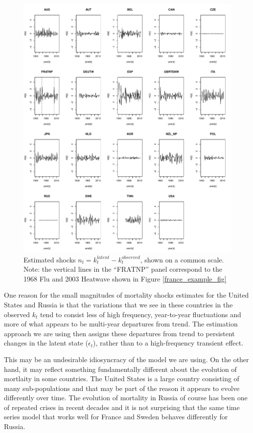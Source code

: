 \documentclass[12pt]{article}
\begin{document}
\begin{figure}
  \includegraphics[width=1.05\textwidth]{./../code/nt_panel_plot.pdf}
  \caption{Estimated shocks $n_t = k_t^{latent} - k_t^{observed}$,
    shown on a common scale. Note: the vertical lines in the
    ``FRATNP'' panel correspond to the 1968 Flu and 2003 Heatwave
    shown in Figure \ref{france_example_fig}}
    \label{nt_panel_fig}
\end{figure}


One reason for the small magnitudes of mortality shocks estimates for
the United States and Russia is that the variations that we see in
these countries in the observed $k_t$ tend to consist less of high
frequency, year-to-year fluctuations and more of what appears to be
multi-year departures from trend. The estimation approach we are using
then assigns these departures from trend to persistent changes in the
latent state ($\epsilon_t$), rather than to a high-frequency transient effect.

This may be an undesirable idiosyncracy of the model we are using. On
the other hand, it may reflect something fundamentally different about
the evolution of mortlaity in some countries. The United States is a
large country consisting of many sub-populations and that may be part of
the reason it appears to evolve differently over time. The evolution
of mortality in Russia of course has been one of repeated crises in
recent decades and it is not surprising that the same time series
model that works well for France and Sweden behaves differently for
Russia.
\end{document}
